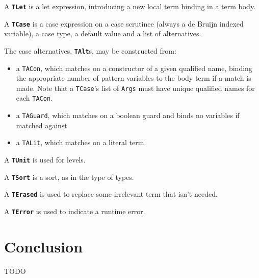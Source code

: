 A \textbf{\lstinline{TLet}} is a let expression, introducing a new local term binding in a term body.

A \textbf{\lstinline{TCase}} is a case expression on a case scrutinee (always a de Bruijn indexed variable), a case type, a default value and a list of alternatives.

The case alternatives, \textbf{\lstinline{TAlt}}s, may be constructed from:
\begin{itemize}
\item a \lstinline{TACon}, which matches on a constructor of a given qualified name, binding the appropriate number of pattern variables to the body term if a match is made. Note that a \lstinline{TCase}'s list of \lstinline{Args} must have unique qualified names for each \lstinline{TACon}.
\item a \lstinline{TAGuard}, which matches on a boolean guard and binds no variables if matched against.
\item a \lstinline{TALit}, which matches on a literal term.
\end{itemize}

A \textbf{\lstinline{TUnit}} is used for levels.

A \textbf{\lstinline{TSort}} is a sort, as in the type of types.

A \textbf{\lstinline{TErased}} is used to replace some irrelevant term that isn't needed.

A \textbf{\lstinline{TError}} is used to indicate a runtime error.


\section{Conclusion}
\label{sec:background_conclusion}

TODO
